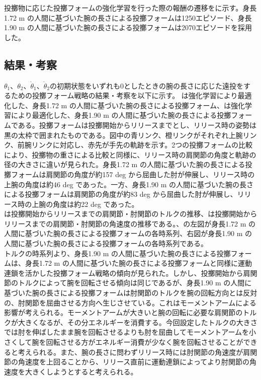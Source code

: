 投擲物に応じた投擲フォームの強化学習を行った際の報酬の遷移をに示す。身長1.72 m の人間に基づいた腕の長さによる投擲フォームは1250エピソード、身長1.90 m の人間に基づいた腕の長さによる投擲フォームは2070エピソードを採用した。

\subsection{結果・考察}
$\theta_{1}$、$\theta_{2}$、$\dot{\theta}_{1}$、$\dot{\theta}_{2}$の初期状態をいずれも0としたときの腕の長さに応じた遠投をするための投擲フォーム戦略の結果・考察を以下に示す。
は強化学習により最適化した、身長1.72 m の人間に基づいた腕の長さによる投擲フォーム、は強化学習により最適化した、身長1.90 m の人間に基づいた腕の長さによる投擲フォームである。投擲フォームは投擲開始からリリースまでとし、リリース時の姿勢は黒の太枠で囲まれたものである。図中の青リンク、橙リンクがそれぞれ上腕リンク、前腕リンクに対応し、赤先が手先の軌跡を示す。2つの投擲フォームの比較により、投擲物の重さによる比較と同様に、リリース時の肩関節の角度と軌跡の径の大きさに違いが見られた。身長1.72 m の人間に基づいた腕の長さによる投擲フォームは肩関節の角度が約157 deg から屈曲した肘が伸展し、リリース時の上腕の角度は約46 deg であった。一方、身長1.90 m の人間に基づいた腕の長さによる投擲フォームは肩関節の角度が約83 deg から屈曲した肘が伸展し、リリース時の上腕の角度は約22 deg であった。\\
は投擲開始からリリースまでの肩関節・肘関節のトルクの推移、は投擲開始からリリースまでの肩関節・肘関節の角速度の推移である。、の左図が身長1.72 m の人間に基づいた腕の長さによる投擲フォームの各時系列、右図が身長1.90 m の人間に基づいた腕の長さによる投擲フォームの各時系列である。\\
トルクの時系列より、身長1.90 m の人間に基づいた腕の長さによる投擲フォームは、身長1.72 m の人間に基づいた腕の長さによる投擲フォームと同様に運動連鎖を活かした投擲フォーム戦略の傾向が見られた。しかし、投擲開始から肩関節のトルクによって腕を回転させる傾向は同じであるが、身長1.90 m の人間に基づいた腕の長さによる投擲フォームは肘関節のトルクを腕の回転方向とは反対の、肘関節を屈曲させる方向へ生じさせている。これはモーメントアームによる影響が考えられる。モーメントアームが大きいと腕の回転に必要な肩関節のトルクが大きくなるが、その分エネルギーを消費する。今回設定したトルクの大きさでは肘を伸ばしたまま腕を回転させるよりも肘を屈曲してモーメントアームを小さくして腕を回転させる方がエネルギー消費が少なく腕を回転させることができると考えられる。また、腕の長さに問わずリリース時には肘関節の角速度が肩関節の角速度を上回ることから、リリース直前に運動連鎖によってより肘関節の角速度を大きくしようとすると考えられる。

